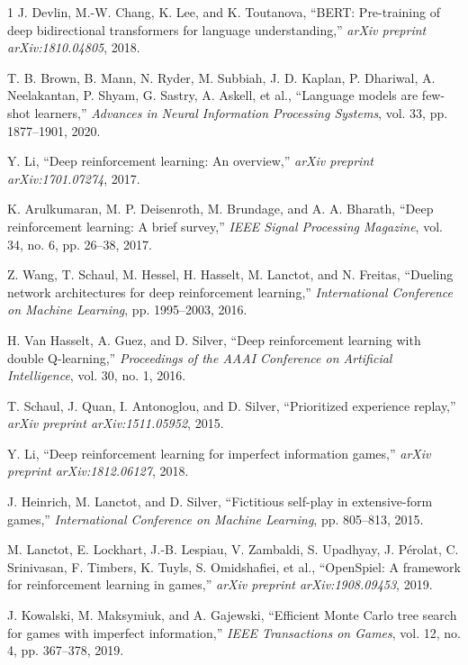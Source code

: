 \documentclass[conference]{IEEEtran}
\begin{document}
\begin{thebibliography}{1}
J. Devlin, M.-W. Chang, K. Lee, and K. Toutanova, ``BERT: Pre-training of deep bidirectional transformers for language understanding,'' \textit{arXiv preprint arXiv:1810.04805}, 2018.

T. B. Brown, B. Mann, N. Ryder, M. Subbiah, J. D. Kaplan, P. Dhariwal, A. Neelakantan, P. Shyam, G. Sastry, A. Askell, et al., ``Language models are few-shot learners,'' \textit{Advances in Neural Information Processing Systems}, vol. 33, pp. 1877--1901, 2020.

Y. Li, ``Deep reinforcement learning: An overview,'' \textit{arXiv preprint arXiv:1701.07274}, 2017.

K. Arulkumaran, M. P. Deisenroth, M. Brundage, and A. A. Bharath, ``Deep reinforcement learning: A brief survey,'' \textit{IEEE Signal Processing Magazine}, vol. 34, no. 6, pp. 26--38, 2017.

Z. Wang, T. Schaul, M. Hessel, H. Hasselt, M. Lanctot, and N. Freitas, ``Dueling network architectures for deep reinforcement learning,'' \textit{International Conference on Machine Learning}, pp. 1995--2003, 2016.

H. Van Hasselt, A. Guez, and D. Silver, ``Deep reinforcement learning with double Q-learning,'' \textit{Proceedings of the AAAI Conference on Artificial Intelligence}, vol. 30, no. 1, 2016.

T. Schaul, J. Quan, I. Antonoglou, and D. Silver, ``Prioritized experience replay,'' \textit{arXiv preprint arXiv:1511.05952}, 2015.

Y. Li, ``Deep reinforcement learning for imperfect information games,'' \textit{arXiv preprint arXiv:1812.06127}, 2018.

J. Heinrich, M. Lanctot, and D. Silver, ``Fictitious self-play in extensive-form games,'' \textit{International Conference on Machine Learning}, pp. 805--813, 2015.

M. Lanctot, E. Lockhart, J.-B. Lespiau, V. Zambaldi, S. Upadhyay, J. Pérolat, C. Srinivasan, F. Timbers, K. Tuyls, S. Omidshafiei, et al., ``OpenSpiel: A framework for reinforcement learning in games,'' \textit{arXiv preprint arXiv:1908.09453}, 2019.

J. Kowalski, M. Maksymiuk, and A. Gajewski, ``Efficient Monte Carlo tree search for games with imperfect information,'' \textit{IEEE Transactions on Games}, vol. 12, no. 4, pp. 367--378, 2019.


\end{thebibliography}
\end{document}
